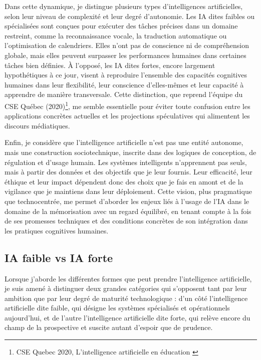 \documentclass[11pt,a4paper]{report}
\begin{document}
Dans cette dynamique, je distingue plusieurs types d’intelligences artificielles, selon leur niveau de complexité et leur degré d’autonomie. Les IA dites faibles ou spécialisées sont conçues pour exécuter des tâches précises dans un domaine restreint, comme la reconnaissance vocale, la traduction automatique ou l’optimisation de calendriers. Elles n’ont pas de conscience ni de compréhension globale, mais elles peuvent surpasser les performances humaines dans certaines tâches bien définies. À l’opposé, les IA dites fortes, encore largement hypothétiques à ce jour, visent à reproduire l’ensemble des capacités cognitives humaines dans leur flexibilité, leur conscience d’elles-mêmes et leur capacité à apprendre de manière transversale. Cette distinction, que reprend l’équipe du CSE Québec (2020)\footnote{CSE Quebec 2020, L’intelligence artificielle en éducation \cite{hypotheses}}, me semble essentielle pour éviter toute confusion entre les applications concrètes actuelles et les projections spéculatives qui alimentent les discours médiatiques.

Enfin, je considère que l’intelligence artificielle n’est pas une entité autonome, mais une construction sociotechnique, inscrite dans des logiques de conception, de régulation et d’usage humain. Les systèmes intelligents n’apprennent pas seuls, mais à partir des données et des objectifs que je leur fournis. Leur efficacité, leur éthique et leur impact dépendent donc des choix que je fais en amont et de la vigilance que je maintiens dans leur déploiement. Cette vision, plus pragmatique que technocentrée, me permet d’aborder les enjeux liés à l’usage de l’IA dans le domaine de la mémorisation avec un regard équilibré, en tenant compte à la fois de ses promesses techniques et des conditions concrètes de son intégration dans les pratiques cognitives humaines.


\subsection{IA faible vs IA forte}

Lorsque j’aborde les différentes formes que peut prendre l’intelligence artificielle, je suis amené à distinguer deux grandes catégories qui s’opposent tant par leur ambition que par leur degré de maturité technologique : d’un côté l’intelligence artificielle dite faible, qui désigne les systèmes spécialisés et opérationnels aujourd’hui, et de l’autre l’intelligence artificielle dite forte, qui relève encore du champ de la prospective et suscite autant d’espoir que de prudence.
\end{document}
